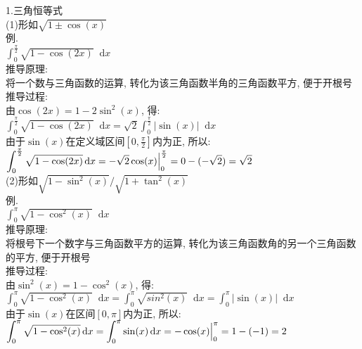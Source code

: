 \documentclass[UTF8, fontset=ubuntu, fleqn, fleqn]{ctexart}
\newcommand*{\dif}{\mathop{}\!\mathrm{d}}
\begin{document}
1.三角恒等式\\
(1)形如$\sqrt{1\pm\cos(x)}$\\
例.\\
$\displaystyle\int_0^{\frac{\pi}{2}}\sqrt{1-\cos(2x)}\dif x$\\
推导原理:\\
将一个数与三角函数的运算, 转化为该三角函数半角的三角函数平方, 便于开根号\\
推导过程:\\
由$\cos(2x)=1-2\sin^2(x)$, 得:\\
$\displaystyle\int_0^{\frac{\pi}{2}}\sqrt{1-\cos(2x)}\dif x=\sqrt{2}\int_0^{\frac{\pi}{2}}|\sin(x)|\dif x$\\
由于$\sin(x)$在定义域区间$[0,\frac{\pi}{2}]$内为正, 所以:\\
$\displaystyle\int_0^{\frac{\pi}{2}}\sqrt{1-\cos(2x)}\dif x=-\sqrt{2}\cos(x)\Big{|}_0^{\frac{\pi}{2}}=0-(-\sqrt{2})=\sqrt{2}$\\

(2)形如$\sqrt{1-\sin^2(x)}/\sqrt{1+\tan^2(x)}$\\
例.\\
$\displaystyle\int_0^{\pi}\sqrt{1-\cos^2(x)}\dif x$\\
推导原理:\\
将根号下一个数字与三角函数平方的运算, 转化为该三角函数角的另一个三角函数的平方, 便于开根号\\
推导过程:\\
由$\sin^2(x)=1-\cos^2(x)$, 得:\\
$\displaystyle\int_0^{\pi}\sqrt{1-\cos^2(x)}\dif x=\int_0^{\pi}\sqrt{sin^2(x)}\dif x=\int_0^{\pi}|\sin(x)|\dif x$\\
由于$\sin(x)$在区间$[0,\pi]$内为正, 所以:\\
$\displaystyle\int_0^{\pi}\sqrt{1-\cos^2(x)}\dif x=\int_0^{\pi}\sin(x)\dif x=-\cos(x)\Big{|}_0^{\pi}=1-(-1)=2$\\
\end{document}
